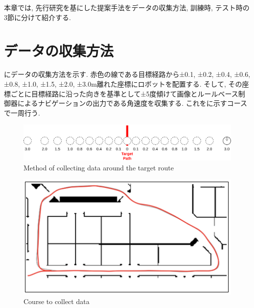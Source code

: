 
本章では, 先行研究を基にした提案手法をデータの収集方法, 訓練時, テスト時の3節に分けて紹介する. 
\section{データの収集方法}
にデータの収集方法を示す. 赤色の線である目標経路から±0.1, ±0.2, ±0.4, ±0.6, ±0.8, ±1.0, ±1.5, ±2.0, ±3.0m離れた座標にロボットを配置する. そして, その座標ごとに目標経路に沿った向きを基準として±5度傾けて画像とルールベース制御器によるナビゲーションの出力である角速度を収集する. これをに示すコースで一周行う. 

\vspace{10mm}

\begin{figure}[h]
  \centering
  \includegraphics[keepaspectratio, scale=0.18]{images/collect-data.png}
  \caption{Method of collecting data around the target route}
  \label{Fig:collect-data}
  \end{figure}

\newpage
\begin{figure}[h]
  \centering
  \includegraphics[keepaspectratio, scale=0.5]{images/willow-garage.png}
  \caption{Course to collect data}
  \label{Fig:willow-garage}
  \end{figure}